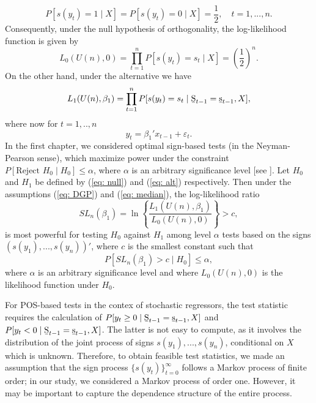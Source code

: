 \documentclass[harvard,11pt]{article}
\begin{document}
\begin{equation}
P[s(y_t)=1\mid X]=P[s(y_t)=0\mid X]=\frac{1}{2},\quad t=1,...,n.
\end{equation}
Consequently, under the null hypothesis of orthogonality, the log-likelihood function is given by
\[
L_0(U(n),0)=\prod\limits_{t=1}^{n}P[s(y_t)=s_t\mid X]=\left(\frac{1}{2}\right)^n.
\]
On the other hand, under the alternative we have
\[
L_1(U(n),\beta_1)=\prod\limits_{t=1}^{n}P[s(y_t)=s_t\mid \text{\b{S}}_{t-1}=\text{\b{s}}_{t-1}, X],
\]
where now for $t=1,..,n$
\[
y_t=\beta_1'x_{t-1}+\varepsilon_t.
\]
In the first chapter, we considered optimal sign-based tests (in the Neyman-Pearson sense), which maximize power under the constraint $P[\text{Reject }  H_0\mid H_0]\leq \alpha$, where $\alpha$ is an arbitrary significance level [see \citet{lehmann2006testing}]. Let $H_0$ and $H_1$ be defined by (\ref{eq: null}) and (\ref{eq: alt}) respectively. Then under the assumptions (\ref{eq: DGP}) and (\ref{eq: median}), the log-likelihood ratio
\begin{equation}\label{eq: teststat}
SL_n(\beta_1)=\ln\left\{\frac{L_1(U(n),\beta_1)}{L_0(U(n),0)}\right\}>c,
\end{equation} 
is most powerful for testing $H_0$ against $H_1$ among level $\alpha$ tests based on the signs $(s(y_1),...,s(y_n))'$, where $c$ is the smallest constant such that 
\[
P[SL_n(\beta_1)>c\mid H_0]\leq \alpha,
\]
where $\alpha$ is an arbitrary significance level and where $L_0(U(n),0)$ is the likelihood function under $H_0$.

 For POS-based tests in the contex of stochastic regressors, the test statistic requires the calculation of $P[y_t\geq0\mid\text{\b{S}}_{t-1}=\text{\b{s}}_{t-1},X]$ and $P[y_t<0\mid\text{\b{S}}_{t-1}=\text{\b{s}}_{t-1},X]$. The latter is not easy to compute, as it involves the distribution of the joint process of signs  $s(y_1),...,s(y_n)$, conditional on $X$ which is unknown. Therefore, to obtain feasible test statistics, we made an assumption that the sign process $\{s(y_t)\}_{t=0}^{\infty}$ follows a Markov process of finite order; in our study, we considered a Markov process of order one. However, it may be important to capture the dependence structure of the entire process.
\end{document}
